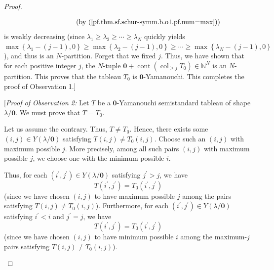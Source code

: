 \begin{proof}
\begin{fineprint}
\begin{align*}
&  \ \ \ \ \ \ \ \ \ \ \ \ \ \ \ \ \ \ \ \ \left(  \text{by
(\ref{pf.thm.sf.schur-symm.b.o1.pf.num=max})}\right)
\end{align*}
is weakly decreasing (since $\lambda_{1}\geq\lambda_{2}\geq\cdots\geq
\lambda_{N}$ quickly yields $\max\left\{  \lambda_{1}-\left(  j-1\right)
,0\right\}  \geq\max\left\{  \lambda_{2}-\left(  j-1\right)  ,0\right\}
\geq\cdots\geq\max\left\{  \lambda_{N}-\left(  j-1\right)  ,0\right\}  $), and
thus is an $N$-partition. Forget that we fixed $j$. Thus, we have shown that
for each positive integer $j$, the $N$-tuple $\mathbf{0}+\operatorname*{cont}%
\left(  \operatorname{col}_{\geq j}T_{0}\right)  \in\mathbb{N}^{N}$ is an
$N$-partition. This proves that the tableau $T_{0}$ is $\mathbf{0}%
$-Yamanouchi. This completes the proof of Observation 1.] \medskip
\end{fineprint}

\begin{fineprint}
[\textit{Proof of Observation 2:} Let $T$ be a $\mathbf{0}$-Yamanouchi
semistandard tableau of shape $\lambda/\mathbf{0}$. We must prove that
$T=T_{0}$.

Let us assume the contrary. Thus, $T\neq T_{0}$. Hence, there exists some
$\left(  i,j\right)  \in Y\left(  \lambda/\mathbf{0}\right)  $ satisfying
$T\left(  i,j\right)  \neq T_{0}\left(  i,j\right)  $. Choose such an $\left(
i,j\right)  $ with maximum possible $j$. More precisely, among all such pairs
$\left(  i,j\right)  $ with maximum possible $j$, we choose one with the
minimum possible $i$.

Thus, for each $\left(  i^{\prime},j^{\prime}\right)  \in Y\left(
\lambda/\mathbf{0}\right)  $ satisfying $j^{\prime}>j$, we have%
\begin{equation}
T\left(  i^{\prime},j^{\prime}\right)  =T_{0}\left(  i^{\prime},j^{\prime
}\right)  \label{pf.thm.sf.schur-symm.b.o2.pf.maxj}%
\end{equation}
(since we have chosen $\left(  i,j\right)  $ to have maximum possible $j$
among the pairs satisfying $T\left(  i,j\right)  \neq T_{0}\left(  i,j\right)
$). Furthermore, for each $\left(  i^{\prime},j^{\prime}\right)  \in Y\left(
\lambda/\mathbf{0}\right)  $ satisfying $i^{\prime}<i$ and $j^{\prime}=j$, we
have%
\begin{equation}
T\left(  i^{\prime},j^{\prime}\right)  =T_{0}\left(  i^{\prime},j^{\prime
}\right)  \label{pf.thm.sf.schur-symm.b.o2.pf.mini}%
\end{equation}
(since we have chosen $\left(  i,j\right)  $ to have minimum possible $i$
among the maximum-$j$ pairs satisfying $T\left(  i,j\right)  \neq T_{0}\left(
i,j\right)  $).


\end{fineprint}
\end{proof}
